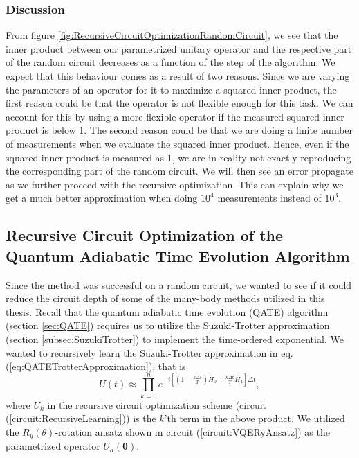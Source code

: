 \subsubsection{Discussion}
From figure \ref{fig:RecursiveCircuitOptimizationRandomCircuit}, we see that the inner product between our parametrized unitary operator and the respective part of the random circuit decreases as a function of the step of the algorithm. We expect that this behaviour comes as a result of two reasons. Since we are varying the parameters of an operator for it to maximize a squared inner product, the first reason could be that the operator is not flexible enough for this task. We can account for this by using a more flexible operator if the measured squared inner product is below 1. The second reason could be that we are doing a finite number of measurements when we evaluate the squared inner product. Hence, even if the squared inner product is measured as 1, we are in reality not exactly reproducing the corresponding part of the random circuit. We will then see an error propagate as we further proceed with the recursive optimization. This can explain why we get a much better approximation when doing $10
^4$ measurements instead of $10^3$.

\subsection{Recursive Circuit Optimization of the Quantum Adiabatic Time Evolution Algorithm}

Since the method was successful on a random circuit, we wanted to see if it could reduce the circuit depth of some of the many-body methods utilized in this thesis. Recall that the quantum adiabatic time evolution (QATE) algorithm (section \ref{sec:QATE}) requires us to utilize the Suzuki-Trotter approximation (section \ref{subsec:SuzukiTrotter}) to implement the time-ordered exponential. We wanted to recursively learn the Suzuki-Trotter approximation in eq. (\ref{eq:QATETrotterApproximation}), that is
$$ U(t) \approx \prod_{k=0}^{n}e^{-i\left[(1-\frac{k\Delta t}{T})\hat{H}_0 + \frac{k\Delta t}{T}\hat{H}_1 \right] \Delta t},$$
where $U_k$ in the recursive circuit optimization scheme (circuit (\ref{circuit:RecursiveLearning})) is the $k$'th term in the above product. We utilized the $R_y(\theta)$-rotation ansatz shown in circuit (\ref{circuit:VQERyAnsatz}) as the parametrized operator $U_a(\boldsymbol{\theta})$.


